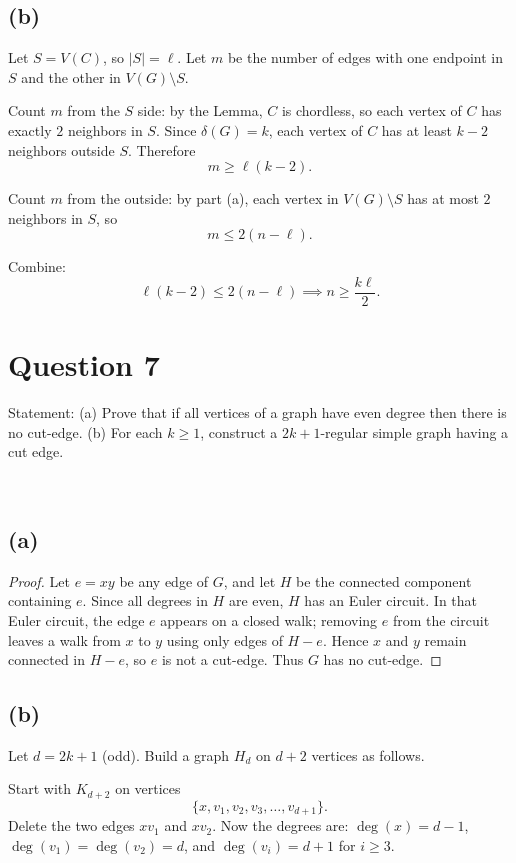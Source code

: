 \documentclass[11pt]{article}
\begin{document}
\subsection*{(b)}
Let $S=V(C)$, so $|S|=\ell$. Let $m$ be the number of edges with one endpoint in $S$ and the other in $V(G)\setminus S$.

Count $m$ from the $S$ side: by the Lemma, $C$ is chordless, so each vertex of $C$ has exactly $2$ neighbors in $S$.
Since $\delta(G)=k$, each vertex of $C$ has at least $k-2$ neighbors outside $S$. Therefore
\[
m \ge \ell (k-2).
\]

Count $m$ from the outside: by part (a), each vertex in $V(G)\setminus S$ has at most $2$ neighbors in $S$,
so
\[
m \le 2(n-\ell).
\]

Combine:
\[
\ell(k-2) \le 2(n-\ell) \implies
n \ge \frac{k\ell}{2}.
\]

\newpage

\section*{Question 7}

Statement: (a) Prove that if all vertices of a graph have even degree then there is no cut-edge. (b) For each $k \ge 1$, construct a $2k +1$-regular simple graph having a cut edge.

~

\subsection*{(a)}
\begin{proof}
    Let $e=xy$ be any edge of $G$, and let $H$ be the connected component containing $e$.
Since all degrees in $H$ are even, $H$ has an Euler circuit.
In that Euler circuit, the edge $e$ appears on a closed walk; removing $e$ from the circuit leaves a
walk from $x$ to $y$ using only edges of $H-e$. Hence $x$ and $y$ remain connected in $H-e$, so $e$ is not a cut-edge.
Thus $G$ has no cut-edge.
\end{proof}

\subsection*{(b)}
Let $d=2k+1$ (odd). Build a graph $H_d$ on $d+2$ vertices as follows.

Start with $K_{d+2}$ on vertices
\[
\{x, v_1, v_2, v_3, \dots, v_{d+1}\}.
\]
Delete the two edges $xv_1$ and $xv_2$.
Now the degrees are: $\deg(x)=d-1$, $\deg(v_1)=\deg(v_2)=d$, and $\deg(v_i)=d+1$ for $i\ge 3$.
\end{document}
